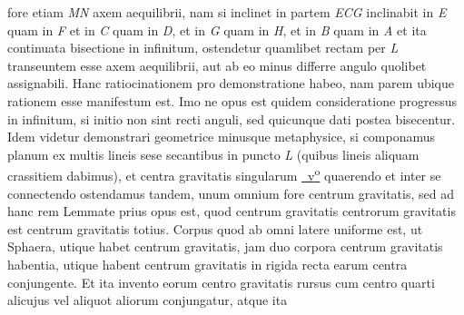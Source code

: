 fore etiam \textit{MN} axem aequilibrii, nam si inclinet in partem \textit{ECG} 
inclinabit in \textit{E} quam in \textit{F} et in \textit{C} quam in \textit{D}, et in \textit{G} quam in \textit{H}, et in \textit{B} quam in \textit{A} 
et ita continuata bisectione in infinitum, ostendetur quamlibet rectam per \textit{L} transeuntem esse axem aequilibrii, 
aut ab eo minus differre angulo quolibet assignabili. 
Hanc ratiocinationem pro demonstratione habeo, nam parem ubique rationem esse manifestum est. 
Imo ne opus est quidem consideratione progressus in infinitum, 
si initio non sint recti anguli, sed quicunque dati postea bisecentur.
\pend
\pstart
Idem videtur demonstrari 
geometrice minusque metaphysice, si componamus planum ex multis lineis
sese secantibus in puncto \textit{L} (quibus lineis aliquam crassitiem dabimus\lbrack)\rbrack, et centra gravitatis singularum
\href{\Scan{LH_37_05_021v}}%
{~v\textsuperscript{o}\rbrack}
quaerendo et inter se connectendo ostendamus tandem, unum omnium fore centrum gravitatis, 
sed ad hanc rem Lemmate prius opus est, quod centrum gravitatis centrorum gravitatis est centrum gravitatis totius.
\pend
\pstart
Corpus quod ab omni latere uniforme est, ut Sphaera, utique habet centrum gravitatis, jam duo corpora centrum gravitatis habentia, utique habent centrum gravitatis 
in rigida recta earum centra conjungente. 
Et ita invento eorum centro gravitatis 
rursus cum centro quarti alicujus vel aliquot aliorum conjungatur, atque ita 
